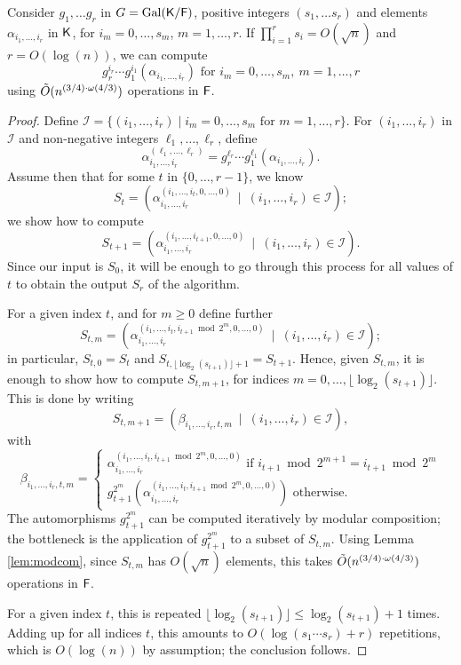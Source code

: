 \begin{lemma}\label{lem:selfcomp}
  Consider $g_1, \ldots g_r$ in $G=\mathrm{Gal}({\mathsf{K}}/{\mathsf{F}})$, positive
  integers $(s_1, \ldots s_r)$ and elements $\alpha_{i_1, \dots, i_r}$
  in ${\mathsf{K}}$, for $i_m=0,\dots,s_m$, $m=1,\dots,r$. If $\prod_{i = 1}^r
  s_i = O(\sqrt{n})$ and $r = O(\log(n))$, we can compute
  $$g_r^{i_r}\cdots g_1^{i_1}(\alpha_{i_1, \dots, i_r})
  \text{~for~} i_m=0,\dots,s_m,\ m=1,\dots,r
  $$  using $\tilde{O}(n^{(3/4)\cdot \omega(4/3)})$ operations in ${\mathsf{F}}$.
\end{lemma}
\begin{proof}
  Define $\mathcal I = \{(i_1,\dots,i_r) \mid i_m=0,\dots,s_m
  \text{~for~} m=1,\dots,r\}$. For $(i_1,\dots,i_r)$ in $\mathcal I$
  and non-negative integers $\ell_1,\dots,\ell_r$, define
  $$\alpha_{i_1, \dots, i_r}^{(\ell_1,\dots,\ell_r)} 
  =g_r^{\ell_r} \cdots g_1^{\ell_1}(\alpha_{i_1, \dots, i_r}).$$  
  Assume then that
  for some $t$ in $\{0,\dots,r-1\}$, we know 
  $$S_t=(\alpha_{i_1, \dots,i_r}^{(i_1, \dots, i_{t},0, \dots, 0)} \ \mid \ (i_1,\dots,i_r)\in \mathcal I);$$ we show how to compute 
  $$S_{t+1}=(\alpha_{i_1, \dots,i_r}^{(i_1, \dots, i_{t+1},0, \dots,
    0)} \ \mid \ (i_1,\dots,i_r)\in \mathcal I).$$ Since our input is
  $S_0$, it will be enough to go through this process for all values
  of $t$ to obtain the output $S_r$ of the algorithm.
  
  For a given index $t$, and for $m \ge 0$
  define further 
  $$S_{t,m}=(\alpha_{i_1, \dots,i_r}^{(i_1, \dots, i_{t},i_{t+1} \bmod
    2^m, 0,\dots, 0)} \ \mid \ (i_1,\dots,i_r)\in \mathcal I);$$ in
  particular, $S_{t,0} = S_t$ and $S_{t,\lfloor
    \log_2(s_{t+1})\rfloor+1} = S_{t+1}$.  Hence, given $S_{t,m}$, it
  is enough to show how to compute $S_{t,m+1}$, for indices
  $m=0,\dots,\lfloor \log_2(s_{t+1})\rfloor$.  This is done by writing
  $$S_{t,m+1}=
  (\beta_{i_1, \dots,i_r,t,m} \ \mid \ (i_1,\dots,i_r)\in \mathcal I),$$
  with
  $$\beta_{i_1, \dots,i_r,t,m}
  =\begin{cases}
  \alpha_{i_1, \dots,i_r}^{(i_1, \dots, i_{t},i_{t+1} \bmod 2^m,0, \dots, 0)}  \text{~if~} 
  i_{t+1} \bmod 2^{m+1} = i_{t+1} \bmod 2^m \\[2mm]
  g_{t+1}^{2^{m}}(\alpha_{i_1, \dots,i_r}^{(i_1, \dots, i_{t},i_{t+1} \bmod 2^m,0, \dots, 0)}) 
  \text{~otherwise.}
  \end{cases}$$
  The automorphisms $g_{t+1}^{2^m}$ can be computed iteratively by modular
  composition; the bottleneck is the application of  $g_{t+1}^{2^m}$
  to a subset of $S_{t,m}$. Using Lemma \ref{lem:modcom}, since 
  $S_{t,m}$ has $O(\sqrt n)$ elements, this takes $\tilde{O}(n^{(3/4)\cdot \omega(4/3)})$ 
  operations in ${\mathsf{F}}$.
  
  For a given index $t$, this is repeated $\lfloor
  \log_2(s_{t+1})\rfloor \le \log_2(s_{t+1}) + 1$ times. Adding up for
  all indices $t$, this amounts to $O(\log (s_1 \cdots s_r)+r)$
  repetitions, which is $O(\log(n))$ by assumption; the conclusion
  follows.
\end{proof}


